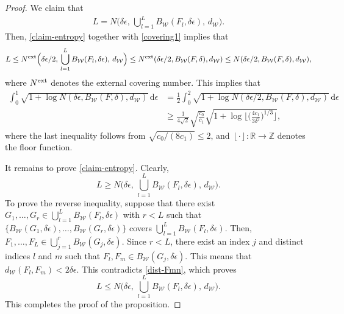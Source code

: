 \documentclass[11pt]{article}
\numberwithin{equation}{section}
\begin{document}
\begin{proof}
    We claim that
    \begin{align}\label{claim-entropy}
    L=N\Big(\delta\epsilon,\,\bigcup_{l=1}^L B_{\mathcal{W}}(F_l, \delta \epsilon),\,d_{\mathcal{W}}\Big).
    \end{align}
    Then, \eqref{claim-entropy} together with \eqref{covering1} implies that
    \begin{align*}
    L\leq N^{\rm ext}\Big(\delta\epsilon/2,\,\bigcup_{l=1}^L B_{\mathcal{W}}(F_l, \delta \epsilon),\,d_{\mathcal{W}}\Big)
    \leq N^{\rm ext}(\delta\epsilon/2,B_{\mathcal{W}}(F, \delta),d_{\mathcal{W}})\leq N(\delta\epsilon/2,B_{\mathcal{W}}(F, \delta),d_{\mathcal{W}}),
    \end{align*}
    where $N^{\rm ext}$ denotes the external covering number.
    This implies that
    \begin{align*}
        \int_{0}^{1} \sqrt{1+\log N(\delta \epsilon, B_{\mathcal{W}}(F, \delta), d_{\mathcal{W}})} \, \mathrm{d} \epsilon %
        &= \frac{1}{2} \int_{0}^2 \sqrt{1+\log N(\delta \epsilon/2, B_{\mathcal{W}}(F, \delta), d_{\mathcal{W}})} \, \mathrm{d} \epsilon \\
        &\ge \frac{1}{4\sqrt{2}}\sqrt{\frac{c_0}{c_1}}\sqrt{1+\log\Big\lfloor\Big(\frac{4c_1}{3\delta^2}\Big)^{1/3}\Big\rfloor},
    \end{align*}
    where the last inequality follows from $\sqrt{c_0/(8c_1)}\le 2$, and $\left\lfloor \cdot \right\rfloor : \mathbb{R} \to \mathbb{Z}$ denotes the floor function.

    It remains to prove \eqref{claim-entropy}. Clearly,
    \[
    L \ge N\Big(\delta\epsilon,\,\bigcup_{l=1}^L B_{\mathcal{W}}(F_l, \delta \epsilon),\,d_{\mathcal{W}}\Big).
    \]
    To prove the reverse inequality, suppose that there exist $G_1, \ldots, G_r \in \bigcup_{l=1}^L B_{\mathcal{W}}(F_l, \delta \epsilon)$ with $r <L$ such that
    $\{B_{\mathcal{W}}(G_1,\delta \epsilon), \ldots, B_{\mathcal{W}}(G_r,\delta \epsilon)\}$ covers $\bigcup_{l=1}^L B_{\mathcal{W}}(F_l, \delta \epsilon)$. Then,
    $F_1, \ldots, F_L \in \bigcup_{j=1}^r B_{\mathcal{W}}(G_j, \delta \epsilon)$. Since $r <L$, there exist an index $j$ and distinct indices $l$ and $m$ such that $F_l, F_m \in B_{\mathcal{W}}(G_j,\delta \epsilon)$. This means that $d_{\mathcal{W}}(F_l,F_m) <2 \delta \epsilon$. This contradicts \eqref{dist-Fmn}, which proves
    \[
    L \le N\Big(\delta\epsilon,\,\bigcup_{l=1}^L B_{\mathcal{W}}(F_l, \delta \epsilon),\,d_{\mathcal{W}}\Big).
    \]
    This completes the proof of the proposition.
\end{proof}
\end{document}
